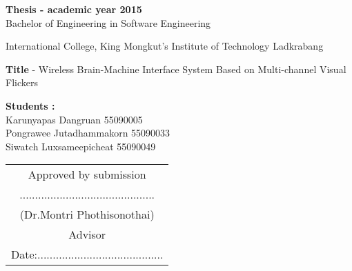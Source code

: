 \begin{approve}
\textbf{Thesis - academic year 2015}\\
Bachelor of Engineering in Software Engineering

International College, King Mongkut's Institute of Technology Ladkrabang


\textbf{Title} - Wireless Brain-Machine Interface System Based on Multi-channel Visual Flickers

\textbf{Students :}\\
Karunyapas  Dangruan  55090005\\
Pongrawee  Jutadhammakorn 55090033\\
Siwatch  Luxsameepicheat  55090049\\

\begin{flushright}
\begin{tabu}{c}

	
	Approved by submission\\
	............................................\\
	(Dr.Montri Phothisonothai)\\
	Advisor\\
	
	Date:.........................................\\
\end{tabu}   
\end{flushright}

\end{approve}